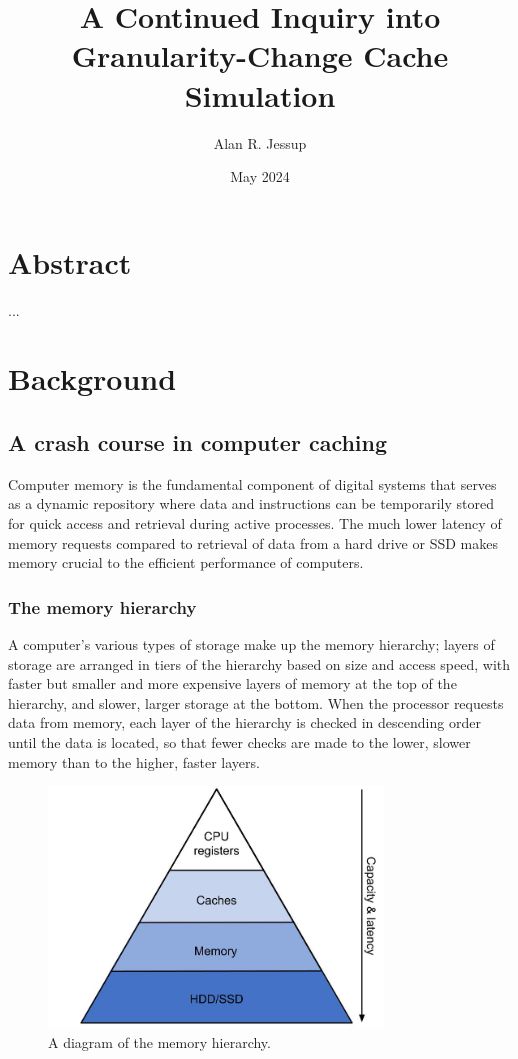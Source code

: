 \documentclass[12pt,twoside]{reedthesis}
\title{A Continued Inquiry into Granularity-Change Cache Simulation}
\author{Alan R. Jessup}
\date{May 2024}
\begin{document}
\maketitle
\frontmatter %
\pagestyle{empty}

\tableofcontents

\chapter*{Abstract}

...

\mainmatter
\pagestyle{fancyplain}

\chapter{Background}

\section{A crash course in computer caching}

Computer memory is the fundamental component of digital systems that serves as a dynamic repository where data and instructions can be temporarily stored for quick access and retrieval during active processes. The much lower latency of memory requests compared to retrieval of data from a hard drive or SSD makes memory crucial to the efficient performance of computers.

	\subsection*{The memory hierarchy}

	A computer's various types of storage make up the memory hierarchy; layers of storage are arranged in tiers of the hierarchy based on size and access speed, with faster but smaller and more expensive layers of memory at the top of the hierarchy, and slower, larger storage at the bottom. When the processor requests data from memory, each layer of the hierarchy is checked in descending order until the data is located, so that fewer checks are made to the lower, slower memory than to the higher, faster layers.

	\begin{figure}[h]
    	\centering
    	\includegraphics[width=3.5in]{figures/mem_hierarchy.jpg}
    	\caption{A diagram of the memory hierarchy.}
	\end{figure}
\end{document}
